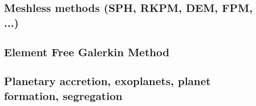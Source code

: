 \subsection{Meshless methods (SPH, RKPM, DEM, FPM, ...)}

{\scriptsize
\noindent
\cite{lucy77}
\cite{beko96}
\cite{mofz97}
\cite{zhfm99}
\cite{begl00}\cite{lihl00}
\cite{idso01}
\cite{lilr02}\cite{lill02}\cite{lili02}
\cite{lill03}\cite{mamo03}
\cite{wali04}\cite{hufl04}
\cite{febh05}\cite{lixl05}\cite{thes05}\cite{thje05a}\cite{thje05b}
\cite{lili06}\cite{yabm06}
\cite{busf07}
\cite{bufs08}\cite{lemx08}
\cite{dacl10}
\cite{prcl11}\cite{kukg11}\cite{kadm11}\cite{szpt11}\cite{howt11}
\cite{szpm12}
\cite{koau13}\cite{viau13}
\cite{dazs14}\cite{lekb14}
\cite{nifs15}
\cite{krrk18}
\cite{meho19}\cite{meho19b}
}

\subsection{Element Free Galerkin Method}

{\scriptsize
\noindent
\cite{begl94b}
\cite{belg95a}
\cite{belg95b}
\cite{bekf96}\cite{como96}
\cite{bekk97}
\cite{pobe98}\cite{zhat98}
\cite{hans03}\cite{katf04}
\cite{huvv04}
\cite{yiha10}\cite{libe10}
}

\subsection{Planetary accretion, exoplanets, planet formation, segregation}

